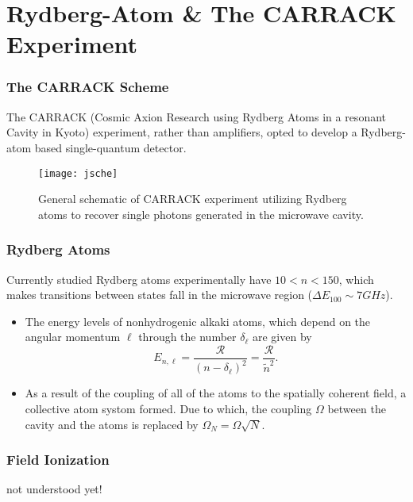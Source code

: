 \documentclass{beamer}
\begin{document}
\section{Rydberg-Atom \& The CARRACK Experiment}
\begin{frame}
  \frametitle{The CARRACK Scheme}
The CARRACK (Cosmic Axion Research using Rydberg Atoms in a resonant Cavity in
Kyoto) experiment, rather than amplifiers, opted to develop a Rydberg-atom
based single-quantum detector.
  \begin{figure}
    \centering
    \texttt{[image: jsche]}
    \caption{General schematic of CARRACK experiment utilizing Rydberg atoms
      to recover single photons generated in the microwave cavity.}
  \end{figure}
\end{frame}
\begin{frame}
  \frametitle{Rydberg Atoms}
  Currently studied Rydberg atoms experimentally have $10<n<150$, which makes
transitions between states fall in the microwave region ($\Delta E_{100} \sim 7GHz$).
  \begin{itemize}
  \item The energy levels of nonhydrogenic alkaki atoms, which depend on the angular momentum $\ell$
    through the number $\delta_{\ell}$ are given
    by $$E_{n,\ell}=\frac{\mathcal{R}}{(n-\delta_{\ell})^2}=\frac{\mathcal{R}}{\tilde{n}^2}.$$
  \item As a result of the coupling of all of the atoms to the spatially
    coherent field, a collective atom systom formed. Due to
    which, the coupling $\Omega$ between the cavity and the atoms is replaced
    by $\Omega_N=\Omega \sqrt{N}$.
  \end{itemize}
\end{frame}
\begin{frame}
  \frametitle{Field Ionization}
not understood yet!
\end{frame}
\end{document}
